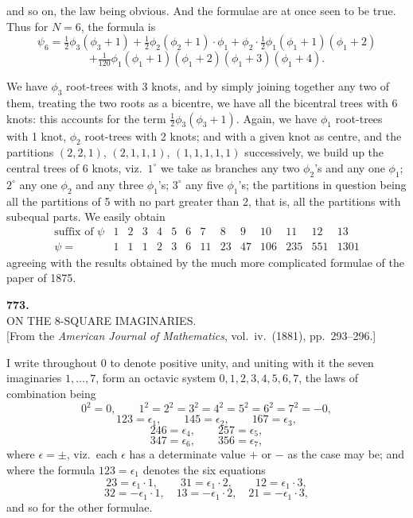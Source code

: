\documentclass[11pt,a4paper]{article}
\begin{document}
\newpage
\noindent
and so on, the law being obvious. And the formulae are at once seen to
be true. Thus for $N=6$, the formula is
\[
  \psi_{6}=\tfrac{1}{2}\phi_{3}(\phi_{3}+1)+\tfrac{1}{2}\phi_{2}(\phi_{2}+1)\cdot\phi_{1}+\phi_{2}\cdot\tfrac{1}{2}\phi_{1}(\phi_{1}+1)(\phi_{1}+2)
\]
\[
  +\tfrac{1}{120}\phi_{1}(\phi_{1}+1)(\phi_{1}+2)(\phi_{1}+3)(\phi_{1}+4).
\]

We have $\phi_{3}$ root-trees with 3 knots, and by simply joining
together any two of them, treating the two roots as a bicentre, we have
all the bicentral trees with 6 knots: this accounts for the term
$\tfrac{1}{2}\phi_{3}(\phi_{3}+1)$. Again, we have $\phi_{1}$
root-trees with 1 knot, $\phi_{2}$ root-trees with 2 knots; and with a
given knot as centre, and the partitions $(2,2,1)$, $(2,1,1,1)$,
$(1,1,1,1,1)$ successively, we build up the central trees of 6 knots,
viz.\ $1^{\circ}$ we take as branches any two $\phi_{2}$'s and any one
$\phi_{1}$; $2^{\circ}$ any one $\phi_{2}$ and any three $\phi_{1}$'s;
$3^{\circ}$ any five $\phi_{1}$'s; the partitions in question being
all the partitions of 5 with no part greater than 2, that is, all the
partitions with subequal parts. We easily obtain
\[
  \begin{array}{c|ccccccccccccc}
    \text{suffix of }\psi & 1 & 2 & 3 & 4 & 5 & 6 & 7  & 8  & 9  & 10  & 11  & 12  & 13 \\
    \hline
    \psi=                 & 1 & 1 & 1 & 2 & 3 & 6 & 11 & 23 & 47 & 106 & 235 & 551 & 1301
  \end{array}
\]
agreeing with the results obtained by the much more complicated
formulae of the paper of 1875.

\bigskip


\newpage
\begin{center}
\textbf{773.}\\[4pt]
\textsc{ON THE 8-SQUARE IMAGINARIES.}\\[4pt]
[From the \textit{American Journal of Mathematics}, vol.\ iv.\ (1881), pp.\ 293--296.]
\end{center}

\bigskip

\noindent
I write throughout $0$ to denote positive unity, and uniting with it
the seven imaginaries $1,\ldots,7$, form an octavic system $0,1,2,3,4,5,6,7$,
the laws of combination being
\[
  0^{2}=0,\qquad 1^{2}=2^{2}=3^{2}=4^{2}=5^{2}=6^{2}=7^{2}=-0,
\]
\[
  123=\epsilon_{1},\qquad 145=\epsilon_{2},\qquad 167=\epsilon_{3},
\]
\[
  246=\epsilon_{4},\qquad 257=\epsilon_{5},
\]
\[
  347=\epsilon_{6},\qquad 356=\epsilon_{7},
\]
where $\epsilon=\pm$, viz.\ each $\epsilon$ has a determinate value $+$
or $-$ as the case may be; and where the formula $123=\epsilon_{1}$
denotes the six equations
\[
  23=\epsilon_{1}\cdot 1,\qquad 31=\epsilon_{1}\cdot 2,\qquad 12=\epsilon_{1}\cdot 3,
\]
\[
  32=-\epsilon_{1}\cdot 1,\quad 13=-\epsilon_{1}\cdot 2,\quad 21=-\epsilon_{1}\cdot 3,
\]
and so for the other formulae.
\end{document}
